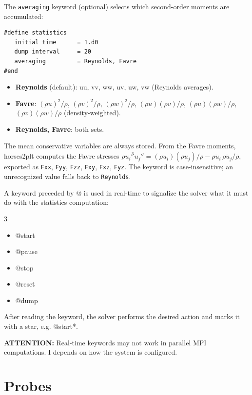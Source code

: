\documentclass[a4paper,10pt]{report}
\begin{document}
The \texttt{averaging} keyword (optional) selects which second-order moments are accumulated:

\begin{lstlisting}
#define statistics
   initial time      = 1.d0
   dump interval     = 20
   averaging         = Reynolds, Favre
#end
\end{lstlisting}

\begin{itemize}
\item \textbf{Reynolds} (default): uu, vv, ww, uv, uw, vw (Reynolds averages).
\item \textbf{Favre}: $(\rho u)^2/\rho$, $(\rho v)^2/\rho$, $(\rho w)^2/\rho$, $(\rho u)(\rho v)/\rho$, $(\rho u)(\rho w)/\rho$, $(\rho v)(\rho w)/\rho$ (density-weighted).
\item \textbf{Reynolds, Favre}: both sets.
\end{itemize}

The mean conservative variables are always stored. From the Favre moments, horses2plt computes the Favre stresses $\overline{\rho u_i'' u_j''} = \overline{(\rho u_i)(\rho u_j)/\rho} - \overline{\rho u_i}\,\overline{\rho u_j}/\overline{\rho}$, exported as \texttt{Fxx}, \texttt{Fyy}, \texttt{Fzz}, \texttt{Fxy}, \texttt{Fxz}, \texttt{Fyz}. The keyword is case-insensitive; an unrecognized value falls back to \texttt{Reynolds}.

A keyword preceded by @ is used in real-time to signalize the solver what it must do with the statistics computation:

\begin{multicols}{3}
\begin{itemize}
\item @start
\item @pause
\item @stop
\item @reset
\item @dump
\end{itemize}
\end{multicols}

After reading the keyword, the solver performs the desired action and marks it with a star, e.g. @start*.

\textbf{ATTENTION:} Real-time keywords may not work in parallel MPI computations. I depends on how the system is configured.


\section{Probes}
\end{document}
